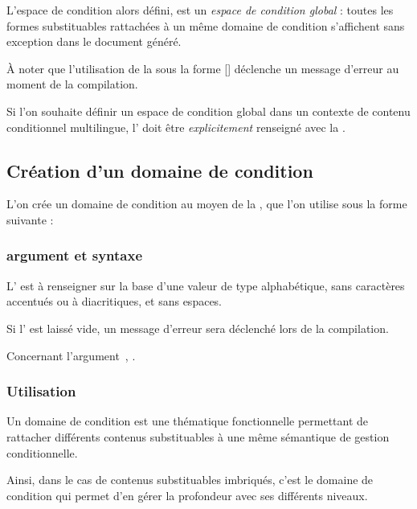 \documentclass{article}
\begin{document}

\resumepar L'espace de condition alors défini, est un \emph{espace de condition global} : toutes les formes substituables rattachées à un même domaine de condition s'affichent sans exception dans le document généré.

À noter que l'utilisation de la  sous la forme [\argo{}\argm{}] déclenche un message d'erreur au moment de la compilation.

 Si l'on souhaite définir un espace de condition global dans un contexte de contenu conditionnel multilingue, l' doit être \emph{explicitement} renseigné avec la .

\subsection{Création d'un domaine de condition}\label{CtDoc_Commandes_NewCondiField}
L'on crée un domaine de condition au moyen de la , que l'on utilise sous la forme suivante :


\subsubsection{argument et syntaxe}
L' est à renseigner sur la base d'une valeur de type alphabétique, sans caractères accentués ou à diacritiques, et sans espaces.

Si l' est laissé vide, un message d'erreur sera déclenché lors de la compilation.

Concernant l'argument~\val{*}, .

\subsubsection{Utilisation}
Un domaine de condition est une thématique fonctionnelle permettant de rattacher différents contenus substituables à une même sémantique de gestion conditionnelle.

Ainsi, dans le cas de contenus substituables imbriqués, c'est le domaine de condition qui permet d'en gérer la profondeur avec ses différents niveaux.
\end{document}
